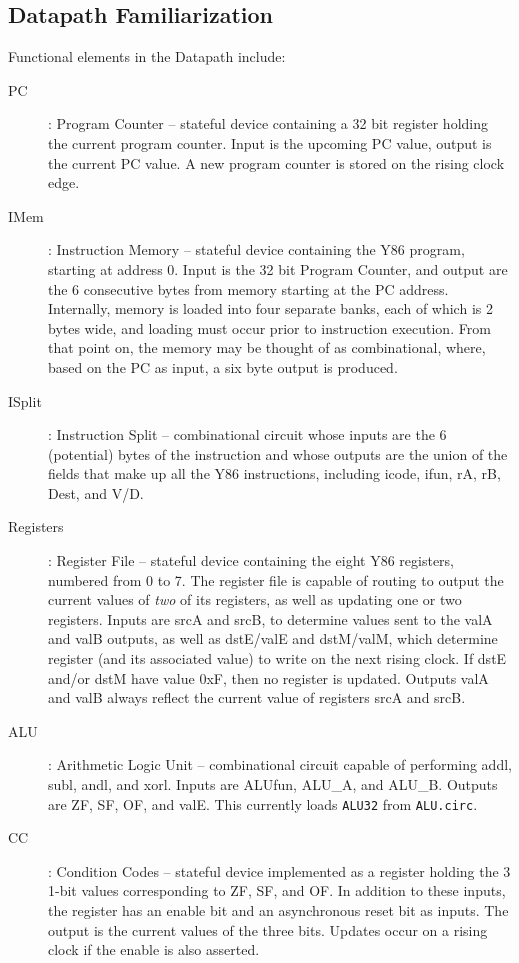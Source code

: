 \documentclass[11pt]{article}
\begin{document}
\subsection*{Datapath Familiarization}
Functional elements in the Datapath include:
\begin{description}
\item[PC]: Program Counter -- stateful device containing a 32 bit register holding the current program counter.  Input is the upcoming PC value, output is the current PC value.  A new program counter is stored on the rising clock edge.
\item[IMem]: Instruction Memory -- stateful device containing the Y86 program, starting at address 0.  Input is the 32 bit Program Counter, and output are the 6 consecutive bytes from memory starting at the PC address.  Internally, memory is loaded into four separate banks, each of which is 2 bytes wide, and loading must occur prior to instruction execution.  From that point on, the memory may be thought of as combinational, where, based on the PC as input, a six byte output is produced.
\item[ISplit]: Instruction Split -- combinational circuit whose inputs are the 6 (potential) bytes of the instruction and whose outputs are the union of the fields that make up all the Y86 instructions, including icode, ifun, rA, rB, Dest, and V/D.
\item[Registers]: Register File -- stateful device containing the eight Y86 registers, numbered from 0 to 7.  The register file is capable of routing to output the current values of {\em two} of its registers, as well as updating one or two registers.  Inputs are srcA and srcB, to determine values sent to the valA and valB outputs, as well as dstE/valE and dstM/valM, which determine register (and its associated value) to write on the next rising clock.  If dstE and/or dstM have value 0xF, then no register is updated.  Outputs valA and valB always reflect the current value of registers srcA and srcB.  
\item[ALU]: Arithmetic Logic Unit -- combinational circuit capable of performing addl, subl, andl, and xorl.  Inputs are ALUfun, ALU\_A, and ALU\_B.  Outputs are ZF, SF, OF, and valE. This currently loads \texttt{ALU32} from \texttt{ALU.circ}.
\item[CC]: Condition Codes -- stateful device implemented as a register holding the 3 1-bit values corresponding to ZF, SF, and OF.  In addition to these inputs, the register has an enable bit and an asynchronous reset bit as inputs.  The output is the current values of the three bits.  Updates occur on a rising clock if the enable is also asserted.

\end{description}
\end{document}
